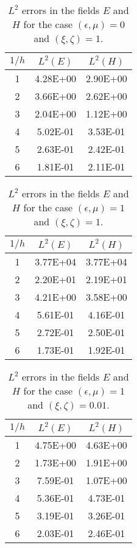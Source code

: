 \documentclass[journal,transmag]{IEEEtran}
\begin{document}
    
    
\begin{table}[]
\centering
    \begin{tabular}{|c|c|c|}
        \hline
        $1/h$ & $L^2(E)$ & $L^2(H)$ \\ \hline
        1     & 4.28E+00 & 2.90E+00 \\ \hline
        2     & 3.66E+00 & 2.62E+00 \\ \hline
        3     & 2.04E+00 & 1.12E+00 \\ \hline
        4     & 5.02E-01 & 3.53E-01 \\ \hline
        5     & 2.63E-01 & 2.42E-01 \\ \hline
        6     & 1.81E-01 & 2.11E-01 \\ \hline
    \end{tabular}
    \caption{$L^2$ errors in the fields $E$ and $H$ for the case $(\epsilon,\mu) = 0$ and $(\xi,\zeta) = 1$.}
    \label{tab:case2}
    \end{table}
    
    
\begin{table}[]
\centering
    \begin{tabular}{|c|c|c|}
        \hline
        $1/h$ & $L^2(E)$ & $L^2(H)$ \\ \hline
        1     & 3.77E+04 & 3.77E+04 \\ \hline
        2     & 2.20E+01 & 2.19E+01 \\ \hline
        3     & 4.21E+00 & 3.58E+00 \\ \hline
        4     & 5.61E-01 & 4.16E-01 \\ \hline
        5     & 2.72E-01 & 2.50E-01 \\ \hline
        6     & 1.73E-01 & 1.92E-01 \\ \hline
    \end{tabular}
    \caption{$L^2$ errors in the fields $E$ and $H$ for the case $(\epsilon,\mu) = 1$ and $(\xi,\zeta) = 1$.}
    \label{tab:case3}
\end{table}



\begin{table}[]
    \centering
    \begin{tabular}{|c|c|c|}
        \hline
        $1/h$ & $L^2(E)$ & $L^2(H)$ \\ \hline
        1     & 4.75E+00 & 4.63E+00 \\ \hline
        2     & 1.73E+00 & 1.91E+00 \\ \hline
        3     & 7.59E-01 & 1.07E+00 \\ \hline
        4     & 5.36E-01 & 4.73E-01 \\ \hline
        5     & 3.19E-01 & 3.26E-01 \\ \hline
        6     & 2.03E-01 & 2.46E-01 \\ \hline
    \end{tabular}
    \caption{$L^2$ errors in the fields $E$ and $H$ for the case $(\epsilon,\mu) = 1$ and $(\xi,\zeta) = 0.01$.}
    \label{tab:case4}
\end{table}
\end{document}
